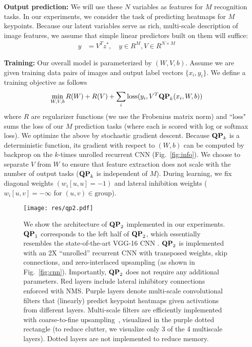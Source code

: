 \documentclass[10pt,twocolumn,letterpaper]{article}
\newcommand{\QP}[1]{{${\bf QP}_{#1}$}}
\begin{document}
{\bf Output prediction:} We will use these $N$ variables as features
for $M$ recognition tasks. In our experiments, we consider the task of
predicting heatmaps for $M$ keypoints. Because our latent variables
serve as rich, multi-scale description of image features, we assume
that simple linear predictors built on them will suffice:
\begin{align}
  y &= V^T z^*, \quad y \in R^M, V \in R^{N \times M}
\end{align}

{\bf Training:} Our overall model is parameterized by
$(W,V,b)$. Assume we are given training data pairs of images and
output label vectors $\{x_i,y_i\}$. We define a training objective as
follows
\begin{align}
  \min_{W,V,b} R(W) + R(V) + \sum_i \text{loss}(y_i,V^T {\bf QP}_k(x_i,W,b)) \label{eq:obj}
\end{align}
\noindent where $R$ are regularizer functions (we use the Frobenius
matrix norm) and ``loss" sums the loss of our $M$ prediction tasks
(where each is scored with log or softmax loss). We optimize the above
by stochastic gradient descent. Because ${\bf QP}_k$ is a
deterministic function, its
gradient with respect to $(W,b)$ can be computed by backprop on the $k$-times
unrolled recurrent CNN (Fig.~\ref{fig:info}). We choose to separate
$V$ from $W$ to ensure that feature extraction does not scale with the
number of output tasks (${\bf QP}_k$ is independent of $M$).  During
learning, we fix diagonal weights $(w_{i}[u,u] = -1)$ and lateral
inhibition weights ($w_i[u,v] = -\infty$ for
$(u,v) \in \text{group}$).

\begin{figure*}[t]
\centering
  \texttt{[image: res/qp2.pdf]}\\
\caption{We show the architecture of \QP{2} implemented in our
    experiments. \QP{1} corresponds to the left half of \QP{2}, which
    essentially resembles the state-of-the-art VGG-16 CNN
    \cite{simonyan2014very}. \QP{2} is implemented with an 2X
    ``unrolled'' recurrent CNN with transposed weights, skip
    connections, and zero-interlaced upsampling (as shown in
    Fig.~\ref{fig:cnn}). Importantly, \QP{2} does not require any
    additional parameters. Red layers include lateral inhibitory
    connections enforced with NMS. Purple layers denote multi-scale
    convolutional filters that (linearly) predict keypoint heatmaps
    given activations from different layers. Multi-scale filters are
    efficiently implemented with coarse-to-fine
    upsampling~\cite{long2014fully}, visualized in the purple dotted
    rectangle (to reduce clutter, we visualize only 3 of the 4 multiscale layers). Dotted layers are not implemented to reduce memory.}
  \label{fig:arch}
\end{figure*}
\end{document}
